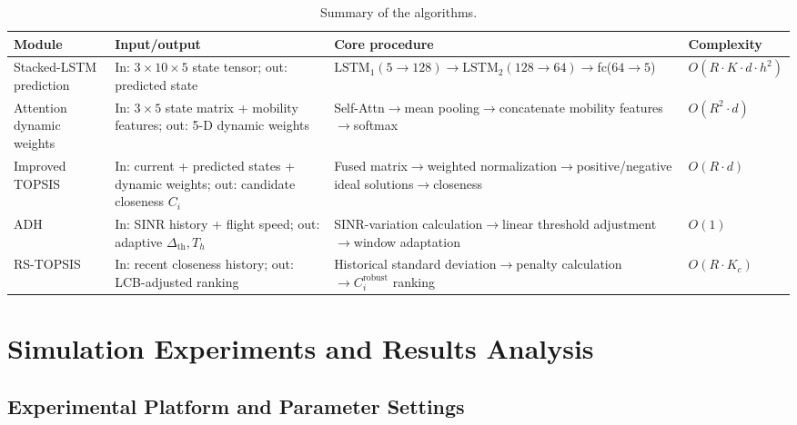 \documentclass[preprint,12pt]{elsarticle}
\newcommand{\arw}{$\rightarrow$\allowbreak\hspace{0pt}}
\begin{document}
\begin{table}[H]
\centering
\caption{Summary of the algorithms.}
\small
\begin{tabularx}{\textwidth}{>{\raggedright\arraybackslash}p{2.6cm}>{\raggedright\arraybackslash}X>{\raggedright\arraybackslash}X>{\raggedright\arraybackslash}p{2.3cm}}
\toprule
\textbf{Module} & \textbf{Input/output} & \textbf{Core procedure} & \textbf{Complexity} \\
\midrule
Stacked-LSTM prediction & In: $3\times10\times5$ state tensor; out: predicted state & $\mathrm{LSTM}_1(5\rightarrow128)\rightarrow\mathrm{LSTM}_2(128\rightarrow64)\rightarrow$fc($64\rightarrow5$) & $O(R\cdot K\cdot d\cdot h^2)$ \\
Attention dynamic weights & In: $3\times5$ state matrix + mobility features; out: 5-D dynamic weights & Self-Attn\arw{}mean pooling\arw{}concatenate mobility features\arw{}softmax & $O(R^2\cdot d)$ \\
Improved TOPSIS & In: current + predicted states + dynamic weights; out: candidate closeness $C_i$ & Fused matrix\arw{}weighted normalization\arw{}positive/negative ideal solutions\arw{}closeness & $O(R\cdot d)$ \\
ADH & In: SINR history + flight speed; out: adaptive $\Delta_{\mathrm{th}},T_h$ & SINR-variation calculation\arw{}linear threshold adjustment\arw{}window adaptation & $O(1)$ \\
RS-TOPSIS & In: recent closeness history; out: LCB-adjusted ranking & Historical standard deviation\arw{}penalty calculation$\rightarrow C_i^{\mathrm{robust}}$ ranking & $O(R\cdot K_c)$ \\
\bottomrule
\end{tabularx}
\label{tab:complexity}
\end{table}

\section{Simulation Experiments and Results Analysis}\label{sec:sim}

\subsection{Experimental Platform and Parameter Settings}\label{sec:platform}
\end{document}
